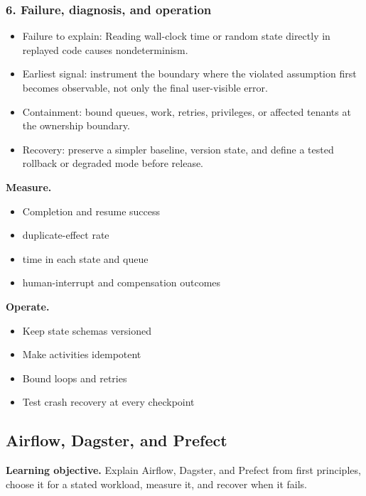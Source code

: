 \subsubsection*{6. Failure, diagnosis, and operation}
\begin{itemize}
\item Failure to explain: Reading wall-clock time or random state directly in replayed code causes nondeterminism.
\item Earliest signal: instrument the boundary where the violated assumption first becomes observable, not only the final user-visible error.
\item Containment: bound queues, work, retries, privileges, or affected tenants at the ownership boundary.
\item Recovery: preserve a simpler baseline, version state, and define a tested rollback or degraded mode before release.
\end{itemize}
\textbf{Measure.}\begin{itemize}
\item Completion and resume success
\item duplicate-effect rate
\item time in each state and queue
\item human-interrupt and compensation outcomes
\end{itemize}
\textbf{Operate.}\begin{itemize}
\item Keep state schemas versioned
\item Make activities idempotent
\item Bound loops and retries
\item Test crash recovery at every checkpoint
\end{itemize}
\subsection{Airflow, Dagster, and Prefect}
\textbf{Learning objective.} Explain Airflow, Dagster, and Prefect from first principles, choose it for a stated workload, measure it, and recover when it fails.
